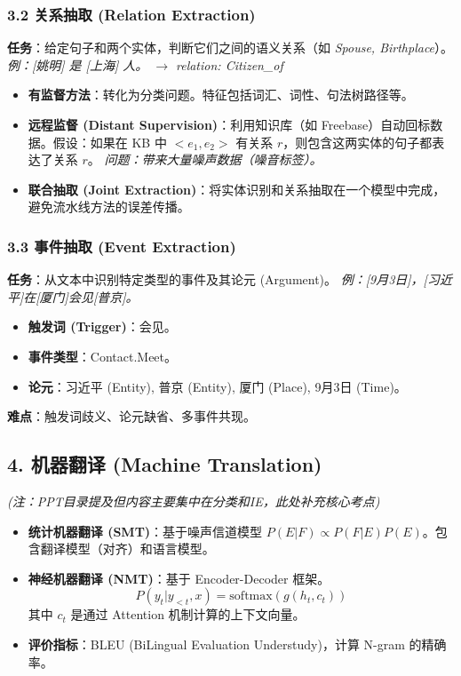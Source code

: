 \documentclass[a4paper, 11pt]{ctexart}
\begin{document}
\subsubsection{3.2 关系抽取 (Relation Extraction)}
\textbf{任务}：给定句子和两个实体，判断它们之间的语义关系（如 \textit{Spouse, Birthplace}）。
\textit{例：[姚明] 是 [上海] 人。 $\to$ relation: Citizen\_of}
\begin{itemize}
    \item \textbf{有监督方法}：转化为分类问题。特征包括词汇、词性、句法树路径等。
    \item \textbf{远程监督 (Distant Supervision)}：利用知识库（如 Freebase）自动回标数据。假设：如果在 KB 中 $<e_1, e_2>$ 有关系 $r$，则包含这两实体的句子都表达了关系 $r$。
    \textit{问题：带来大量噪声数据（噪音标签）。}
    \item \textbf{联合抽取 (Joint Extraction)}：将实体识别和关系抽取在一个模型中完成，避免流水线方法的误差传播。
\end{itemize}

\subsubsection{3.3 事件抽取 (Event Extraction)}
\textbf{任务}：从文本中识别特定类型的事件及其论元 (Argument)。
\textit{例：[9月3日]，[习近平]在[厦门]会见[普京]。}
\begin{itemize}
    \item \textbf{触发词 (Trigger)}：会见。
    \item \textbf{事件类型}：Contact.Meet。
    \item \textbf{论元}：习近平 (Entity), 普京 (Entity), 厦门 (Place), 9月3日 (Time)。
\end{itemize}
\textbf{难点}：触发词歧义、论元缺省、多事件共现。

\subsection{4. 机器翻译 (Machine Translation)}
\begin{note}
\textit{(注：PPT目录提及但内容主要集中在分类和IE，此处补充核心考点)}
\end{note}
\begin{itemize}
    \item \textbf{统计机器翻译 (SMT)}：基于噪声信道模型 $P(E|F) \propto P(F|E)P(E)$。包含翻译模型（对齐）和语言模型。
    \item \textbf{神经机器翻译 (NMT)}：基于 Encoder-Decoder 框架。
    $$ P(y_t | y_{<t}, x) = \text{softmax}(g(h_t, c_t)) $$
    其中 $c_t$ 是通过 Attention 机制计算的上下文向量。
    \item \textbf{评价指标}：BLEU (BiLingual Evaluation Understudy)，计算 N-gram 的精确率。
\end{itemize}
\end{document}
